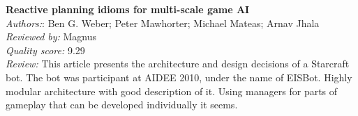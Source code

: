 \textbf{Reactive planning idioms for multi-scale game AI}\\
\textit{Authors:}: Ben G. Weber; Peter Mawhorter; Michael Mateas; Arnav Jhala\\
\textit{Reviewed by:} Magnus\\
\textit{Quality score:} 9.29\\
\textit{Review:} This article presents the architecture and design decisions of a Starcraft bot. The bot was participant at AIDEE 2010, under the name of EISBot. Highly modular architecture with good description of it. Using managers for parts of gameplay that can be developed individually it seems.
